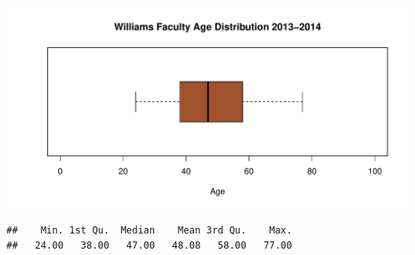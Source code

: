 \documentclass[12pt,a4paper]{article}\usepackage[]{graphicx}\usepackage[]{color}
\makeatletter
\def\maxwidth{ %
  \ifdim\Gin@nat@width>\linewidth
    \linewidth
  \else
    \Gin@nat@width
  \fi
}
\newenvironment{kframe}{%
 \def\at@end@of@kframe{}%
 \ifinner\ifhmode%
  \def\at@end@of@kframe{\end{minipage}}%
  \begin{minipage}{\columnwidth}%
 \fi\fi%
 \def\FrameCommand##1{\hskip\@totalleftmargin \hskip-\fboxsep
 \colorbox{shadecolor}{##1}\hskip-\fboxsep
     \hskip-\linewidth \hskip-\@totalleftmargin \hskip\columnwidth}%
 \MakeFramed {\advance\hsize-\width
   \@totalleftmargin\z@ \linewidth\hsize
   \@setminipage}}%
 {\par\unskip\endMakeFramed%
 \at@end@of@kframe}
\newenvironment{knitrout}{}{} %
\theoremstyle{definition}
\makeatother
\begin{document}
\begin{knitrout}
\color{fgcolor}
\includegraphics[width=\maxwidth]{figure/unnamed-chunk-32-1} 

\end{knitrout}

\begin{knitrout}
\color{fgcolor}\begin{kframe}
\begin{verbatim}
##    Min. 1st Qu.  Median    Mean 3rd Qu.    Max. 
##   24.00   38.00   47.00   48.08   58.00   77.00
\end{verbatim}
\end{kframe}
\end{knitrout}
\end{document}
